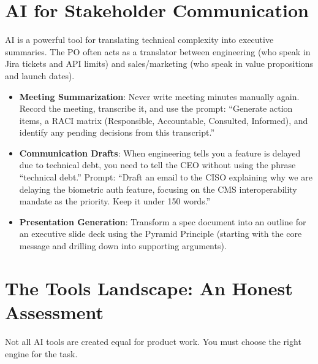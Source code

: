 \section{AI for Stakeholder
Communication}\label{ai-for-stakeholder-communication}

AI is a powerful tool for translating technical complexity into
executive summaries. The PO often acts as a translator between
engineering (who speak in Jira tickets and API limits) and
sales/marketing (who speak in value propositions and launch dates).

\begin{itemize}
\tightlist
\item
  \textbf{Meeting Summarization}: Never write meeting minutes manually
  again. Record the meeting, transcribe it, and use the prompt:
  ``Generate action items, a RACI matrix (Responsible, Accountable,
  Consulted, Informed), and identify any pending decisions from this
  transcript.''
\item
  \textbf{Communication Drafts}: When engineering tells you a feature is
  delayed due to technical debt, you need to tell the CEO without using
  the phrase ``technical debt.'' Prompt: ``Draft an email to the CISO
  explaining why we are delaying the biometric auth feature, focusing on
  the CMS interoperability mandate as the priority. Keep it under 150
  words.''
\item
  \textbf{Presentation Generation}: Transform a spec document into an
  outline for an executive slide deck using the Pyramid Principle
  (starting with the core message and drilling down into supporting
  arguments).
\end{itemize}

\section{The Tools Landscape: An Honest
Assessment}\label{the-tools-landscape-an-honest-assessment}

Not all AI tools are created equal for product work. You must choose the
right engine for the task.

